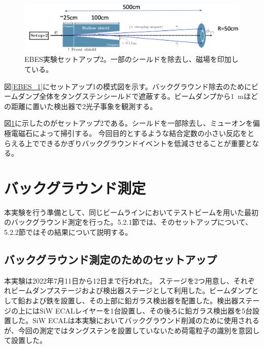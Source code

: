 \begin{figure}[H]
	\begin{center}
		\includegraphics[width=330pt]{./Figure/EBES/EBES_2.png}
		\caption[EBES実験セットアップ2]{EBES実験セットアップ2。一部のシールドを除去し、磁場を印加している。}
		\label{EBES_2}
	\end{center}
\end{figure}


図\ref{EBES_1}にセットアップ1の模式図を示す。バックグラウンド除去のためにビームダンプ全体をタングステンシールドで遮蔽する。ビームダンプから\SI{1}{m}ほどの距離に置いた検出器で2光子事象を観測する。

図\ref{EBES_2}に示したのがセットアップ2である。シールドを一部除去し、ミューオンを偏極電磁石によって掃引する。
今回目的とするような結合定数の小さい反応をとらえる上でできるかぎりバックグラウンドイベントを低減させることが重要となる。


\section{バックグラウンド測定}
本実験を行う準備として、同じビームラインにおいてテストビームを用いた最初のバックグラウンド測定を行った。5.2.1節では、そのセットアップについて、5.2.2節ではその結果について説明する。

\subsection{バックグラウンド測定のためのセットアップ}
本実験は2022年7月11日から12日まで行われた。%
ステージを2つ用意し、それぞれビームダンプステージおよび検出器ステージとして利用した。ビームダンプとして鉛および鉄を設置し、その上部に鉛ガラス検出器を配置した。検出器ステージの上にはSiW ECALレイヤーを1台設置し、その後ろに鉛ガラス検出器を5台設置した。SiW ECALは本実験においてバックグラウンド削減のために使用されるが、今回の測定ではタングステンを設置していないため荷電粒子の識別を意図して設置した。


